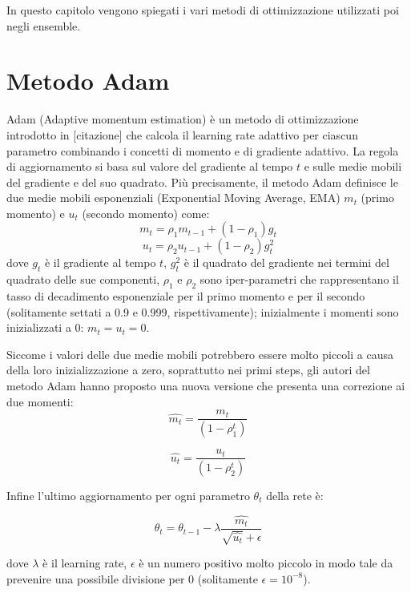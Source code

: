 In questo capitolo vengono spiegati i vari metodi di ottimizzazione utilizzati poi negli ensemble.

\section{Metodo Adam}
Adam (Adaptive momentum estimation) è un metodo di ottimizzazione introdotto in [citazione] che calcola il learning rate adattivo per ciascun parametro combinando i concetti di momento e di gradiente adattivo. La regola di aggiornamento si basa sul valore del gradiente al tempo $t$ e sulle medie mobili del gradiente e del suo quadrato. Più precisamente, il metodo Adam definisce le due medie mobili esponenziali (Exponential Moving Average, EMA) $m_{t}$ (primo momento) e $u_{t}$ (secondo momento) come:
\begin{equation}
	m_{t} = \rho_{1}m_{t-1}+(1-\rho_{1})g_{t}
\end{equation}
\begin{equation}
	u_{t} = \rho_{2}u_{t-1}+(1-\rho_{2})g_{t}^{2}
\end{equation}
dove $g_{t}$ è il gradiente al tempo $t$, $g_{t}^{2}$ è il quadrato del gradiente nei termini del quadrato delle sue componenti, $\rho_{1}$ e $\rho_{2}$ sono iper-parametri che rappresentano il tasso di decadimento esponenziale per il primo momento e per il secondo (solitamente settati a 0.9 e 0.999, rispettivamente); inizialmente i momenti sono inizializzati a 0: $m_{t} = u_{t} = 0$. 

Siccome i valori delle due medie mobili potrebbero essere molto piccoli a causa della loro inizializzazione a zero, soprattutto nei primi steps, gli autori del metodo Adam hanno proposto una nuova versione che presenta una correzione ai due momenti:
\begin{equation}
	\hat{m_{t}} = \frac{m_{t}}{(1-\rho_{1}^{t})}
\end{equation}

\begin{equation}
	\hat{u_{t}} = \frac{u_{t}}{(1-\rho_{2}^{t})}
\end{equation}


Infine l'ultimo aggiornamento per ogni parametro $\theta_{t}$ della rete è:

\begin{equation}
	\theta_{t} = \theta_{t-1}-\lambda\frac{\hat{m_{t}}}{\sqrt{\hat{u_{t}}}+\epsilon}
\end{equation}

dove $\lambda$ è il learning rate, $\epsilon$ è un numero positivo molto piccolo in modo tale da prevenire una possibile divisione per 0 (solitamente $\epsilon=10^{-8}$).

